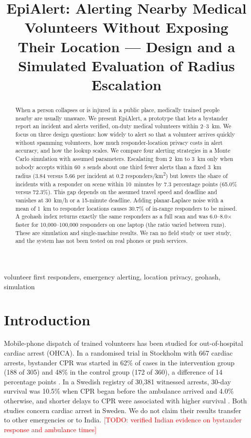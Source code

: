 \documentclass[conference]{IEEEtran}
\newcommand{\todo}[1]{\textcolor{red}{[TODO: #1]}}
\begin{document}
\title{EpiAlert: Alerting Nearby Medical Volunteers Without Exposing Their Location --- Design and a Simulated Evaluation of Radius Escalation}

\author{\IEEEauthorblockN{\todo{author names}}
\IEEEauthorblockA{\todo{institution, guide, city, e-mail}}}

\maketitle

\begin{abstract}
When a person collapses or is injured in a public place, medically trained people nearby are usually unaware. We present EpiAlert, a prototype that lets a bystander report an incident and alerts verified, on-duty medical volunteers within 2--3~km. We focus on three design questions: how widely to alert so that a volunteer arrives quickly without spamming volunteers, how much responder-location privacy costs in alert accuracy, and how the lookup scales. We compare four alerting strategies in a Monte Carlo simulation with assumed parameters. Escalating from 2~km to 3~km only when nobody accepts within 60~s sends about one third fewer alerts than a fixed 3~km radius (3.84 versus 5.66 per incident at 0.2 responders/km\textsuperscript{2}) but lowers the share of incidents with a responder on scene within 10~minutes by 7.3 percentage points (65.0\% versus 72.3\%). This gap depends on the assumed travel speed and deadline and vanishes at 30~km/h or a 15-minute deadline. Adding planar-Laplace noise with a mean of 1~km to responder locations causes 30.7\% of in-range responders to be missed. A geohash index returns exactly the same responders as a full scan and was 6.0--8.0$\times$ faster for 10{,}000--100{,}000 responders on one laptop (the ratio varied between runs). These are simulation and single-machine results. We ran no field study or user study, and the system has not been tested on real phones or push services.
\end{abstract}

\begin{IEEEkeywords}
volunteer first responders, emergency alerting, location privacy, geohash, simulation
\end{IEEEkeywords}

\section{Introduction}
Mobile-phone dispatch of trained volunteers has been studied for out-of-hospital cardiac arrest (OHCA). In a randomised trial in Stockholm with 667 cardiac arrests, bystander CPR was started in 62\% of cases in the intervention group (188 of 305) and 48\% in the control group (172 of 360), a difference of 14 percentage points \cite{ringh2015mobile}. In a Swedish registry of 30{,}381 witnessed arrests, 30-day survival was 10.5\% when CPR began before the ambulance arrived and 4.0\% otherwise, and shorter delays to CPR were associated with higher survival \cite{hasselqvist2015early}. Both studies concern cardiac arrest in Sweden. We do not claim their results transfer to other emergencies or to India. \todo{verified Indian evidence on bystander response and ambulance times}
\end{document}
